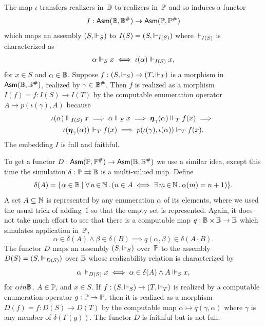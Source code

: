 The map $\iota$ transfers realizers in~$\mathbb{B}$ to realizers
in~$\mathbb{P}$ and so induces a functor
%
\begin{equation*}
  I : \mathsf{Asm}(\mathbb{B}, \mathbb{B}^{\#}) \to \mathsf{Asm}(\mathbb{P}, \mathbb{P}^{\#})
\end{equation*}
%
which maps an assembly $(S, {\Vdash_S})$ to $I(S) = (S, {\Vdash_{I(S)}})$
where $\Vdash_{I(S)}$ is characterized as
%
\begin{equation*}
  \alpha \Vdash_S x \iff
  \iota(\alpha) \Vdash_{I(S)} x,
\end{equation*}
%
for $x \in S$ and $\alpha \in \mathbb{B}$.
%
Suppose $f : (S, {\Vdash_S}) \to (T, {\Vdash_T})$ is a morphism in
$\mathsf{Asm}(\mathbb{B}, \mathbb{B}^{\#})$, realized by $\gamma \in \mathbb{B}^{\#}$.
Then $f$ is realized as a morphism $I(f) = f : I(S) \to I(T)$ by the
computable enumeration operator $A \mapsto p(\iota(\gamma), A)$
because
%
\begin{multline*}
  \iota(\alpha) \Vdash_{I(S)} x \implies
  \alpha \Vdash_S x \implies
  \text{\boldmath{$\eta$}}_{\gamma}(\alpha) \Vdash_T f(x) \implies {}\\
  \iota(\text{\boldmath{$\eta$}}_{\gamma}(\alpha)) \Vdash_T f(x) \implies
  p(\iota(\gamma), \iota(\alpha)) \Vdash_T f(x).
\end{multline*}
%
The embedding $I$ is full and faithful.

To get a functor $D : \mathsf{Asm}(\mathbb{P}, \mathbb{P}^{\#}) \to \mathsf{Asm}(\mathbb{B},
  \mathbb{B}^{\#})$ we use a similar idea, except this time the
simulation $\delta : \mathbb{P} \rightrightarrows \mathbb{B}$ is a multi-valued map.
Define
%
\begin{equation*}
  \delta(A) = \{\alpha \in \mathbb{B} \mid
    \forall\, n \,{\in}\, \mathbb{N}\,.\left(n \in A \iff \exists\, m \,{\in}\, \mathbb{N}\,.\,\alpha(m) = n + 1\right)
  \}.
\end{equation*}
%
A set $A \subseteq \mathbb{N}$ is represented by any enumeration $\alpha$ of
its elements, where we used the usual trick of adding~$1$ so that the
empty set is represented. Again, it does not take much effort to see
that there is a computable map $q : \mathbb{B} \times \mathbb{B} \to \mathbb{B}$
which simulates application in~$\mathbb{P}$,
%
\begin{equation*}
  \alpha \in \delta(A) \land
  \beta \in \delta(B) \implies q(\alpha, \beta) \in \delta(A \cdot B).
\end{equation*}
%
The functor $D$ maps an assembly $(S, {\Vdash_S})$ over~$\mathbb{P}$ to the
assembly $D(S) = (S, {\Vdash_{D(S)}})$ over $\mathbb{B}$ whose realizability
relation is characterized by
%
\begin{equation*}
  \alpha \Vdash_{D(S)} x \iff
  \alpha \in \delta(A) \land A \Vdash_S x,
\end{equation*}
%
for $\alpha in \mathbb{B}$, $A \in \mathbb{P}$, and $x \in S$. If $f : (S,
{\Vdash_S}) \to (T, {\Vdash_T})$ is realized by a computable enumeration
operator $g : \mathbb{P} \to \mathbb{P}$, then it is realized as a morphism
$D(f) = f : D(S) \to D(T)$ by the computable map $\alpha \mapsto
q(\gamma, \alpha)$ where $\gamma$ is any member of
$\delta(\Gamma(g))$. The functor $D$ is faithful but is not full.


